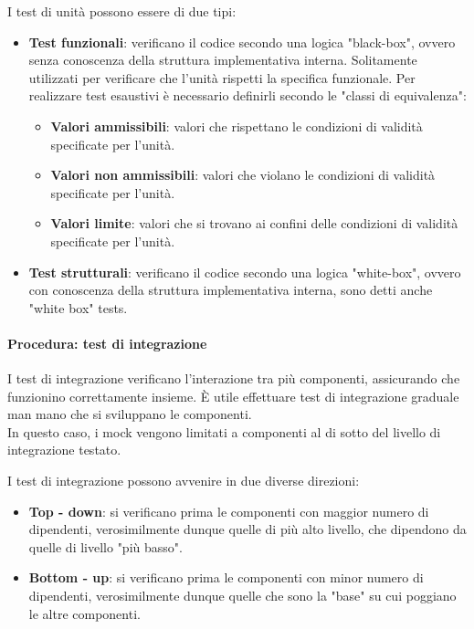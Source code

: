 \documentclass[a4paper,12pt]{article}
\begin{document}
I test di unità possono essere di due tipi:
\begin{itemize}
    \item \textbf{Test funzionali}: verificano il codice secondo una logica "black-box", ovvero senza conoscenza della struttura implementativa interna. Solitamente utilizzati per verificare che l'unità rispetti la specifica funzionale. Per realizzare test esaustivi è necessario definirli secondo le "classi di equivalenza":
        \begin{itemize}
        \item \textbf{Valori ammissibili}: valori che rispettano le condizioni di validità specificate per l'unità.
        \item \textbf{Valori non ammissibili}: valori che violano le condizioni di validità specificate per l'unità.
        \item \textbf{Valori limite}: valori che si trovano ai confini delle condizioni di validità specificate per l'unità.
        \end{itemize}
    \item \textbf{Test strutturali}: verificano il codice secondo una logica "white-box", ovvero con conoscenza della struttura implementativa interna, sono detti anche "white box" tests.
    
\end{itemize}

\paragraph{Procedura: test di integrazione}
I test di integrazione verificano l'interazione tra più componenti, assicurando che funzionino correttamente insieme. È utile effettuare test di integrazione graduale man mano che si sviluppano le componenti.\\
In questo caso, i mock vengono limitati a componenti al di sotto del livello di integrazione testato.

I test di integrazione possono avvenire in due diverse direzioni:
\begin{itemize}
    \item \textbf{Top - down}: si verificano prima le componenti con maggior numero di dipendenti, verosimilmente dunque quelle di più alto livello, che dipendono da quelle di livello "più basso".
    \item \textbf{Bottom - up}: si verificano prima le componenti con minor numero di dipendenti, verosimilmente dunque quelle che sono la "base" su cui poggiano le altre componenti.
\end{itemize}
\end{document}
